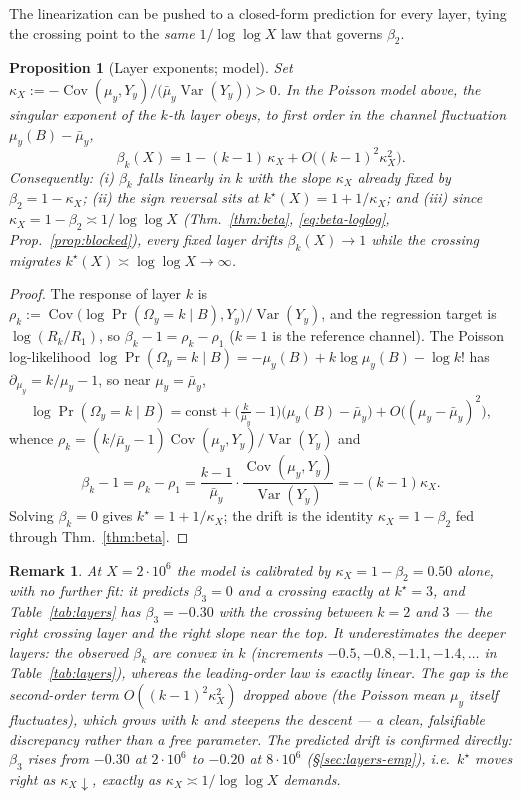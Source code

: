 \documentclass[]{interact}%
\newtheorem{remark}{Remark}
\newtheorem{proposition}{Proposition}
\newcommand{\OmegaF}{\Omega}
\begin{document}
The linearization can be pushed to a closed-form prediction for every layer, tying the
crossing point to the \emph{same} $1/\log\log X$ law that governs $\beta_2$.

\begin{proposition}[Layer exponents; model]\label{prop:layers}
Set $\kappa_X:=-\operatorname{Cov}(\mu_y,Y_y)/\big(\bar\mu_y\operatorname{Var}(Y_y)\big)>0$.
In the Poisson model above, the singular exponent of the $k$-th layer obeys, to first
order in the channel fluctuation $\mu_y(B)-\bar\mu_y$,
\[
  \beta_k(X)=1-(k-1)\,\kappa_X+O\!\big((k-1)^2\kappa_X^2\big).
\]
Consequently: \emph{(i)} $\beta_k$ falls linearly in $k$ with the slope $\kappa_X$ already
fixed by $\beta_2=1-\kappa_X$; \emph{(ii)} the sign reversal sits at
$k^\star(X)=1+1/\kappa_X$; and \emph{(iii)} since $\kappa_X=1-\beta_2\asymp1/\log\log X$
(Thm.~\ref{thm:beta}, \eqref{eq:beta-loglog}, Prop.~\ref{prop:blocked}), every fixed layer
drifts $\beta_k(X)\to1$ while the crossing migrates $k^\star(X)\asymp\log\log X\to\infty$.
\end{proposition}

\begin{proof}
The response of layer $k$ is $\rho_k:=\operatorname{Cov}\big(\log\Pr(\OmegaF_y=k\mid B),Y_y\big)/\operatorname{Var}(Y_y)$,
and the regression target is $\log(R_k/R_1)$, so $\beta_k-1=\rho_k-\rho_1$ ($k=1$ is the
reference channel). The Poisson log-likelihood
$\log\Pr(\OmegaF_y=k\mid B)=-\mu_y(B)+k\log\mu_y(B)-\log k!$ has
$\partial_{\mu_y}=k/\mu_y-1$, so near $\mu_y=\bar\mu_y$,
\[
  \log\Pr(\OmegaF_y=k\mid B)=\mathrm{const}+\big(\tfrac{k}{\bar\mu_y}-1\big)\big(\mu_y(B)-\bar\mu_y\big)+O\big((\mu_y-\bar\mu_y)^2\big),
\]
whence $\rho_k=(k/\bar\mu_y-1)\operatorname{Cov}(\mu_y,Y_y)/\operatorname{Var}(Y_y)$ and
\[
  \beta_k-1=\rho_k-\rho_1=\frac{k-1}{\bar\mu_y}\cdot\frac{\operatorname{Cov}(\mu_y,Y_y)}{\operatorname{Var}(Y_y)}=-(k-1)\kappa_X.
\]
Solving $\beta_k=0$ gives $k^\star=1+1/\kappa_X$; the drift is the identity $\kappa_X=1-\beta_2$
fed through Thm.~\ref{thm:beta}.
\end{proof}

\begin{remark}
At $X=2\cdot10^{6}$ the model is calibrated by $\kappa_X=1-\beta_2=0.50$ alone, with
\emph{no} further fit: it predicts $\beta_3=0$ and a crossing exactly at $k^\star=3$, and
Table~\ref{tab:layers} has $\beta_3=-0.30$ with the crossing between $k=2$ and $3$ --- the
right crossing layer and the right slope near the top. It \emph{underestimates} the deeper
layers: the observed $\beta_k$ are convex in $k$ (increments $-0.5,-0.8,-1.1,-1.4,\dots$ in
Table~\ref{tab:layers}), whereas the leading-order law is exactly linear. The gap is the
second-order term $O((k-1)^2\kappa_X^2)$ dropped above (the Poisson mean $\mu_y$ itself
fluctuates), which grows with $k$ and steepens the descent --- a clean, falsifiable
discrepancy rather than a free parameter. The predicted drift is confirmed directly:
$\beta_3$ rises from $-0.30$ at $2\cdot10^{6}$ to $-0.20$ at $8\cdot10^{6}$
(\S\ref{sec:layers-emp}), i.e.\ $k^\star$ moves right as $\kappa_X\downarrow$, exactly as
$\kappa_X\asymp1/\log\log X$ demands.
\end{remark}
\end{document}
